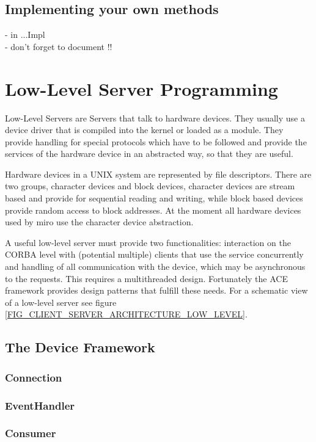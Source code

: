 \subsection{Implementing your own methods}

- in ...Impl \\
- don't forget to document !!


\section{Low-Level Server Programming}

Low-Level Servers are Servers that talk to hardware devices. They
usually use a device driver that is compiled into the kernel or loaded 
as a module. They provide handling for special protocols which have to 
be followed and provide the services of the hardware device in an
abstracted way, so that they are useful.

Hardware devices in a UNIX system are represented by file
descriptors. There are two groups, character devices and block devices,
character devices are stream based and provide for sequential reading
and writing, while block based devices provide random access to block
addresses. At the moment all hardware devices used by miro use the
character device abstraction.

A useful \miro low-level server must provide two functionalities:
interaction on the CORBA level with (potential multiple) clients that
use the service concurrently and handling of all communication with
the device, which may be asynchronous to the requests. This requires a
multithreaded design. Fortunately the ACE framework provides design
patterns that fulfill these needs. For a schematic view of a \miro
low-level server see figure
\ref{FIG_CLIENT_SERVER_ARCHITECTURE_LOW_LEVEL}.


\subsection{The Device Framework}

\subsubsection{Connection}

\subsubsection{EventHandler}

\subsubsection{Consumer}

